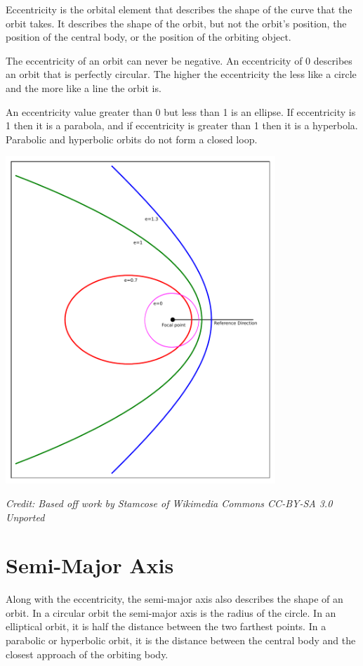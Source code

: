 \documentclass[]{book}
\begin{document}
Eccentricity is the orbital element that describes the shape of the curve
that the orbit takes.  It describes the shape of the orbit, but not the
orbit's position, the position of the central body, or the position of
the orbiting object.

The eccentricity of an orbit can never be negative.  An eccentricity of
0 describes an orbit that is perfectly circular.  The higher the
eccentricity the less like a circle and the more like a line the orbit is.

An eccentricity value greater than 0 but less than 1 is an ellipse. If
eccentricity is 1 then it is a parabola, and if eccentricity is greater
than 1 then it is a hyperbola.  Parabolic and hyperbolic orbits do not
form a closed loop.

\bigskip
\includegraphics[width=4in]{images/Kepler_orbits}

\textit{Credit: Based off work by Stamcose of Wikimedia Commons CC-BY-SA 3.0 Unported}
\bigskip

\section{Semi-Major Axis}

Along with the eccentricity, the semi-major axis also describes the shape
of an orbit.  In a circular orbit the semi-major axis is the radius of the
circle.  In an elliptical orbit, it is half the distance between the two
farthest points.  In a parabolic or hyperbolic orbit, it is the distance
between the central body and the closest approach of the orbiting body.
\end{document}
